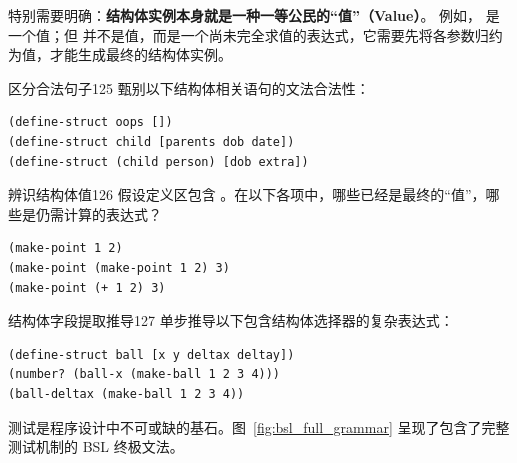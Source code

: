 特别需要明确：\textbf{结构体实例本身就是一种一等公民的“值”（Value）}。
例如， 是一个值；但  并不是值，而是一个尚未完全求值的表达式，它需要先将各参数归约为值，才能生成最终的结构体实例。

\begin{exercise}{区分合法句子}{125}
甄别以下结构体相关语句的文法合法性：
\begin{lstlisting}[language=BSL]
(define-struct oops [])
(define-struct child [parents dob date])
(define-struct (child person) [dob extra])
\end{lstlisting}
\end{exercise}

\begin{exercise}{辨识结构体值}{126}
假设定义区包含 。在以下各项中，哪些已经是最终的“值”，哪些是仍需计算的表达式？
\begin{lstlisting}[language=BSL]
(make-point 1 2)
(make-point (make-point 1 2) 3)
(make-point (+ 1 2) 3)
\end{lstlisting}
\end{exercise}

\begin{exercise}{结构体字段提取推导}{127}
单步推导以下包含结构体选择器的复杂表达式：
\begin{lstlisting}[language=BSL]
(define-struct ball [x y deltax deltay])
(number? (ball-x (make-ball 1 2 3 4)))
(ball-deltax (make-ball 1 2 3 4))
\end{lstlisting}
\end{exercise}

\label{sec:int01_bsl_tests}

测试是程序设计中不可或缺的基石。图~\ref{fig:bsl_full_grammar} 呈现了包含了完整测试机制的 BSL 终极文法。

